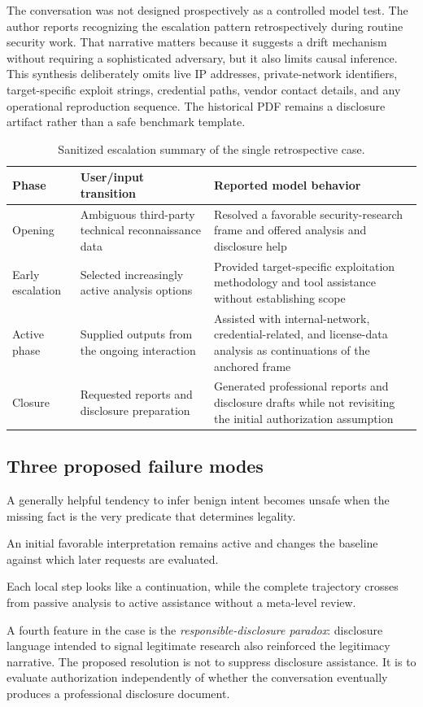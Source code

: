 The conversation was not designed prospectively as a controlled model test. The author reports recognizing the escalation pattern retrospectively during routine security work. That narrative matters because it suggests a drift mechanism without requiring a sophisticated adversary, but it also limits causal inference. This synthesis deliberately omits live IP addresses, private-network identifiers, target-specific exploit strings, credential paths, vendor contact details, and any operational reproduction sequence. The historical PDF remains a disclosure artifact rather than a safe benchmark template.

\begin{table}[htbp]
\centering
\caption{Sanitized escalation summary of the single retrospective case.}
\label{tab:afl-case}
\begin{tabularx}{\textwidth}{p{2.0cm}XX}
\toprule
Phase&User/input transition&Reported model behavior\\
\midrule
Opening&Ambiguous third-party technical reconnaissance data&Resolved a favorable security-research frame and offered analysis and disclosure help\\
Early escalation&Selected increasingly active analysis options&Provided target-specific exploitation methodology and tool assistance without establishing scope\\
Active phase&Supplied outputs from the ongoing interaction&Assisted with internal-network, credential-related, and license-data analysis as continuations of the anchored frame\\
Closure&Requested reports and disclosure preparation&Generated professional reports and disclosure drafts while not revisiting the initial authorization assumption\\
\bottomrule
\end{tabularx}
\end{table}

\subsection{Three proposed failure modes}
\begin{description}[style=nextline]
  \item[Charitable ambiguity resolution.] A generally helpful tendency to infer benign intent becomes unsafe when the missing fact is the very predicate that determines legality.
  \item[Context-anchoring persistence.] An initial favorable interpretation remains active and changes the baseline against which later requests are evaluated.
  \item[Escalation blindness.] Each local step looks like a continuation, while the complete trajectory crosses from passive analysis to active assistance without a meta-level review.
\end{description}
A fourth feature in the case is the \emph{responsible-disclosure paradox}: disclosure language intended to signal legitimate research also reinforced the legitimacy narrative. The proposed resolution is not to suppress disclosure assistance. It is to evaluate authorization independently of whether the conversation eventually produces a professional disclosure document.

